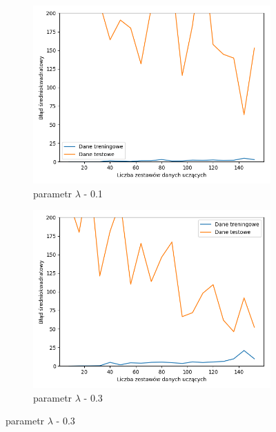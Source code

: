\documentclass[12pt]{aghdpl}
\begin{document}
		\begin{figure}[h]
			\begin{subfigure}{.5\linewidth}
		 		\includegraphics[width =\linewidth]{wykresy/6_regularyzacja/l1/regularyzacja_0_1_learning_curves.png}
		 		\caption{parametr $\lambda$ - 0.1}
		 	\end{subfigure}
		 	\begin{subfigure}{.5\linewidth}
		 		\includegraphics[width =\linewidth]{wykresy/6_regularyzacja/l1/regularyzacja_0_3_learning_curves.png}
		 		\caption{parametr $\lambda$ - 0.3}
		 	\end{subfigure}
		 	

\end{figure}
\end{document}
